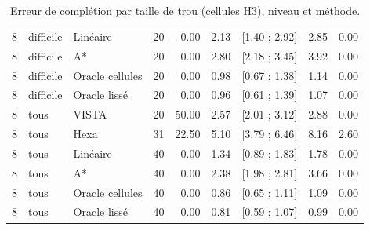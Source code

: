 \begin{table}[t]
\begin{tabular}{lllrrrrrr}
8 & difficile & Linéaire & 20 & 0.00 & 2.13 & [1.40 ; 2.92] & 2.85 & 0.00 \\
8 & difficile & A* & 20 & 0.00 & 2.80 & [2.18 ; 3.45] & 3.92 & 0.00 \\
8 & difficile & Oracle cellules & 20 & 0.00 & 0.98 & [0.67 ; 1.38] & 1.14 & 0.00 \\
8 & difficile & Oracle lissé & 20 & 0.00 & 0.96 & [0.61 ; 1.39] & 1.07 & 0.00 \\
8 & tous & VISTA & 20 & 50.00 & 2.57 & [2.01 ; 3.12] & 2.88 & 0.00 \\
8 & tous & Hexa & 31 & 22.50 & 5.10 & [3.79 ; 6.46] & 8.16 & 2.60 \\
8 & tous & Linéaire & 40 & 0.00 & 1.34 & [0.89 ; 1.83] & 1.78 & 0.00 \\
8 & tous & A* & 40 & 0.00 & 2.38 & [1.98 ; 2.81] & 3.66 & 0.00 \\
8 & tous & Oracle cellules & 40 & 0.00 & 0.86 & [0.65 ; 1.11] & 1.09 & 0.00 \\
8 & tous & Oracle lissé & 40 & 0.00 & 0.81 & [0.59 ; 1.07] & 0.99 & 0.00 \\
\bottomrule
\end{tabular}
\caption{Erreur de complétion par taille de trou (cellules H3), niveau et méthode.}
\label{tab:resultats}
\end{table}
